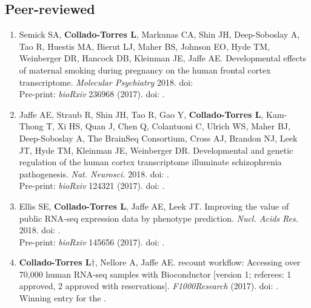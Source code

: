 \subsection{Peer-reviewed}
    \begin{enumerate}
        \item Semick SA, \textbf{Collado-Torres L}, Markunas CA, Shin JH, Deep-Soboslay A, Tao R, Huestis MA, Bierut LJ, Maher BS, Johnson EO, Hyde TM, Weinberger DR, Hancock DB, Kleinman JE, Jaffe AE. Developmental effects of maternal smoking during pregnancy on the human frontal cortex transcriptome. \emph{Molecular Psychiatry} 2018. doi: 
        \\ Pre-print: \emph{bioRxiv} 236968 (2017). doi: .
        
        \item Jaffe AE, Straub R, Shin JH, Tao R, Gao Y, \textbf{Collado-Torres L}, Kam-Thong T, Xi HS, Quan J, Chen Q, Colantuoni C, Ulrich WS, Maher BJ, Deep-Soboslay A, The BrainSeq Consortium, Cross AJ, Brandon NJ, Leek JT, Hyde TM, Kleinman JE, Weinberger DR. Developmental and genetic regulation of the human cortex transcriptome illuminate schizophrenia pathogenesis. \emph{Nat. Neurosci.} 2018. doi: .
        \\ Pre-print: \emph{bioRxiv} 124321 (2017). doi: .
        
        \item Ellis SE, \textbf{Collado-Torres L}, Jaffe AE, Leek JT. Improving the value of public RNA-seq expression data by phenotype prediction. \emph{Nucl. Acids Res.} 2018. doi: .
        \\ Pre-print: \emph{bioRxiv} 145656 (2017). doi: .
        
        \item \textbf{Collado-Torres L}$\dagger$, Nellore A, Jaffe AE. 
        recount workflow: Accessing over 70,000 human RNA-seq samples with Bioconductor [version 1; referees: 1 approved, 2 approved with reservations]. \emph{F1000Research} (2017). doi: .
        \\ Winning entry for the .
        

\end{enumerate}
